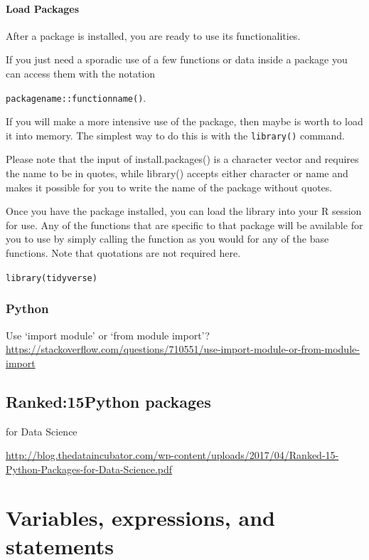 \documentclass[]{book}
\begin{document}
\hypertarget{load-packages}{%
\subsubsection{Load Packages}\label{load-packages}}

After a package is installed, you are ready to use its functionalities.

If you just need a sporadic use of a few functions or data inside a package you can access them with the notation

\texttt{packagename::functionname()}.

If you will make a more intensive use of the package, then maybe is worth to load it into memory. The simplest way to do this is with the \texttt{library()} command.

Please note that the input of install.packages() is a character vector and requires the name to be in quotes, while library() accepts either character or name and makes it possible for you to write the name of the package without quotes.

Once you have the package installed, you can load the library into your R session for use. Any of the functions that are specific to that package will be available for you to use by simply calling the function as you would for any of the base functions. Note that quotations are not required here.

\texttt{library(tidyverse)}

\hypertarget{python-4}{%
\subsection{Python}\label{python-4}}

Use `import module' or `from module import'? \url{https://stackoverflow.com/questions/710551/use-import-module-or-from-module-import}

\hypertarget{ranked15python-packages}{%
\section{Ranked:15Python packages}\label{ranked15python-packages}}

for Data Science

\url{http://blog.thedataincubator.com/wp-content/uploads/2017/04/Ranked-15-Python-Packages-for-Data-Science.pdf}

\hypertarget{variables-expressions-and-statements}{%
\chapter{Variables, expressions, and statements}\label{variables-expressions-and-statements}}
\end{document}
